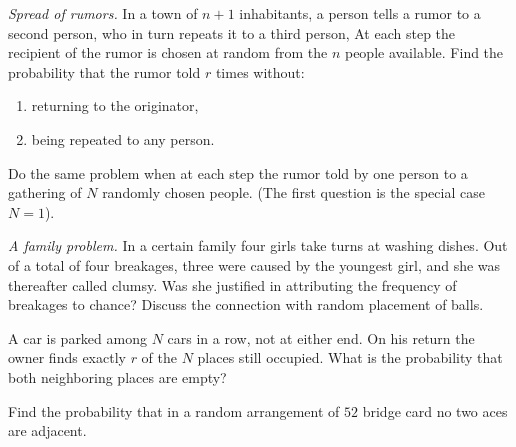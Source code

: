 \begin{problem}
  \emph{Spread of rumors.} In a town of \(n+1\) inhabitants, a person tells
  a rumor to a second person, who in turn repeats it to a third person,
  \etc{} At each step the recipient of the rumor is chosen at random from the
  \(n\) people available. Find the probability that the rumor told \(r\)
  times without:
  \begin{enumerate}[label=(\alph*),noitemsep]
  \item returning to the originator,
  \item being repeated to any person.
  \end{enumerate}
  Do the same problem when at each step the rumor told by one person to a
  gathering of \(N\) randomly chosen people. (The first question is the
  special case \(N=1\)).
\end{problem}
\begin{solution}

\end{solution}
\newpage

\begin{problem}
  \emph{A family problem.} In a certain family four girls take turns at
  washing dishes. Out of a total of four breakages, three were caused by
  the youngest girl, and she was thereafter called clumsy. Was she
  justified in attributing the frequency of breakages to chance? Discuss
  the connection with random placement of balls.
\end{problem}
\begin{solution}

\end{solution}
\newpage

\begin{problem}
  A car is parked among \(N\) cars in a row, not at either end. On his
  return the owner finds exactly \(r\) of the \(N\) places still
  occupied. What is the probability that both neighboring places are empty?
\end{problem}
\begin{solution}

\end{solution}
\newpage

\begin{problem}
  Find the probability that in a random arrangement of \(52\) bridge card
  no two aces are adjacent.
\end{problem}
\begin{solution}

\end{solution}
\newpage

